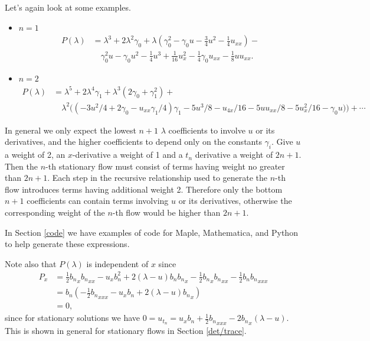 \documentclass[12pt, a4paper]{article}
\begin{document}
Let's again look at some examples.

\begin{itemize}
  \item $n=1$
    \begin{align*}
      P(\lambda)
      &=
      \lambda^3 + 2\lambda^2 \gamma_0 + \lambda \left(
      \gamma_0^2 - \gamma_0 u - \tfrac{3}{4} u^2 -
      \tfrac{1}{4}u_{xx} \right) - \\
      & \quad
      \gamma_0^2 u - \gamma_0 u^2 - \tfrac{1}{4}u^3 + \tfrac{1}{16} u_x^2
      -\tfrac{1}{4} \gamma_0 u_{xx} - \tfrac{1}{8} u u_{xx}.
    \end{align*}

  \item $n=2$
    \begin{align*}
      P(\lambda)
      &=
      \lambda^5 + 2\lambda^4 \gamma_1 + \lambda^3 (2\gamma_0 + \gamma_1^2)
      + \\
      & \quad
      \lambda^2 \big( \left(-3 u^2/4 + 2 \gamma_0 - u_{xx} \gamma_1/4 \right)
      \gamma_1 - 5 u^3/8 - u_{4x}/16 - 5 u u_{xx}/8 - 5u_x^2/16 -
      \gamma_0u) \big) + \cdots
    \end{align*}
\end{itemize}

In general we only expect the lowest $n+1$ $\lambda$ coefficients to
involve $u$ or its derivatives, and the higher coefficients to depend
only on the constants $\gamma_i$. Give $u$ a weight of 2, an
$x$-derivative a weight of 1 and a $t_n$ derivative a weight of
$2n+1$. Then the $n$-th stationary flow must consist of terms having
weight no greater than $2n+1$. Each step in the recursive relationship
used to generate the $n$-th flow introduces terms having additional
weight 2. Therefore only the bottom $n+1$ coefficients can contain terms
involving $u$ or its derivatives, otherwise the corresponding weight of
the $n$-th flow would be higher than $2n+1$.

In Section \ref{code} we have examples of code for Maple, Mathematica,
and Python to help generate these expressions.

Note also that $P(\lambda)$ is independent of $x$ since
\begin{align*}
  P_x
  &=
  \tfrac{1}{2} {b_n}_x {b_n}_{xx} - u_x b_n^2 + 2(\lambda-u) b_n {b_n}_x
  -\tfrac{1}{2} {b_n}_x {b_n}_{xx} - \tfrac{1}{2} b_n {b_n}_{xxx} \\
  &=
  b_n \left(-\frac{1}{2} {b_n}_{xxx} - u_x b_n + 2(\lambda-u) {b_n}_x
  \right)\\
  &= 0,
\end{align*}
since for stationary solutions we have $0=u_{t_n}=u_x
b_n+\frac{1}{2}{b_n}_{xxx}-2{b_n}_x (\lambda-u)$.  This is shown in
general for stationary flows in Section \ref{det/trace}.
\end{document}
